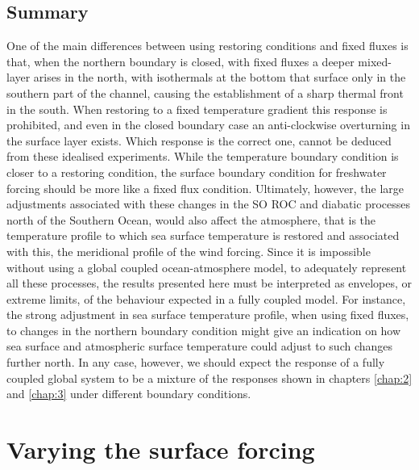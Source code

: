 \subsection{Summary}
One of the main differences between using restoring conditions and fixed fluxes is that, when the northern boundary is closed, with fixed fluxes a deeper mixed-layer arises in the north, with isothermals at the bottom that surface only in the southern part of the channel, causing the establishment of a sharp thermal front in the south. When restoring to a fixed temperature gradient this response is prohibited, and even in the closed boundary case an anti-clockwise overturning in the surface layer exists. Which response is the correct one, cannot be deduced from these idealised experiments. While the temperature boundary condition is closer to a restoring condition, the surface boundary condition for freshwater forcing should be more like a fixed flux condition. Ultimately, however, the large adjustments associated with these changes in the SO ROC and diabatic processes north of the Southern Ocean, would also affect the atmosphere, that is the temperature profile to which sea surface temperature is restored and associated with this, the meridional profile of the wind forcing. Since it is impossible without using a global coupled ocean-atmosphere model, to adequately represent all these processes, the results presented here must be interpreted as envelopes, or extreme limits, of the behaviour expected in a fully coupled model. For instance, the strong adjustment in sea surface temperature profile, when using fixed fluxes, to changes in the northern boundary condition might give an indication on how sea surface and atmospheric surface temperature could adjust to such changes further north. In any case, however, we should expect the response of a fully coupled global system to be a mixture of the responses shown in chapters \ref{chap:2} and \ref{chap:3} under different boundary conditions. 

\section{Varying the surface forcing}

